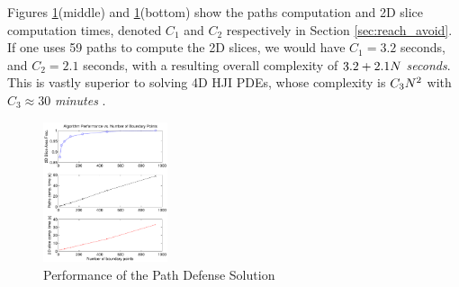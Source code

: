 Figures \ref{fig:alg_perf_1}(middle) and \ref{fig:alg_perf_1}(bottom) show the paths computation and 2D slice computation times, denoted $C_1$ and $C_2$ respectively in Section \ref{sec:reach_avoid}. If one uses 59 paths to compute the 2D slices, we would have $C_1=3.2$ seconds, and $C_2=2.1$ seconds, with a resulting overall complexity of $3.2 + 2.1 N$ \textit{seconds}. This is vastly superior to solving 4D HJI PDEs, whose complexity is $C_3N^2$ with $C_3\approx30$ \textit{minutes} \cite{Chen2014}.

\begin{figure}[H]
	\centering
	\includegraphics[width=0.325\textwidth]{"fig/alg_perf_1"}
	\caption{Performance of the Path Defense Solution}
	\label{fig:alg_perf_1}
\end{figure}
